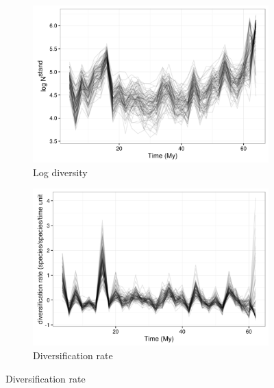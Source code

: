 \documentclass[12pt,letterpaper]{article}
\begin{document}
\begin{figure}[ht]
  \begin{subfigure}[b]{0.45\textwidth}
    \includegraphics[width=\textwidth,height=0.5\textheight,keepaspectratio=true]{figure/log_diversity}
    \caption{Log diversity}
    \label{fig:diversity_est}
  \end{subfigure}
  \begin{subfigure}[b]{0.45\textwidth}
    \includegraphics[width=\textwidth,height=0.5\textheight,keepaspectratio=true]{figure/div_rate}
    \caption{Diversification rate}
    \label{fig:diversity_rate}
  \end{subfigure}


\end{figure}
\end{document}

